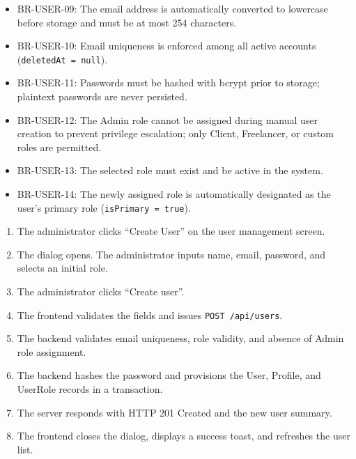\begin{itemize}[leftmargin=1.6em,topsep=3pt,itemsep=2pt,parsep=0pt,label=$\bullet$]\brrulelist
    \item BR-USER-09: The email address is automatically converted to lowercase before storage and must be at most 254 characters.
    \item BR-USER-10: Email uniqueness is enforced among all active accounts (\texttt{deletedAt = null}).
    \item BR-USER-11: Passwords must be hashed with bcrypt prior to storage; plaintext passwords are never persisted.
    \item BR-USER-12: The Admin role cannot be assigned during manual user creation to prevent privilege escalation; only Client, Freelancer, or custom roles are permitted.
    \item BR-USER-13: The selected role must exist and be active in the system.
    \item BR-USER-14: The newly assigned role is automatically designated as the user's primary role (\texttt{isPrimary = true}).
\end{itemize}

\begin{enumerate}[leftmargin=1.6em,topsep=3pt,itemsep=2pt,parsep=0pt]
    \item The administrator clicks ``Create User'' on the user management screen.
    \item The dialog opens. The administrator inputs name, email, password, and selects an initial role.
    \item The administrator clicks ``Create user''.
    \item The frontend validates the fields and issues \texttt{POST /api/users}.
    \item The backend validates email uniqueness, role validity, and absence of Admin role assignment.
    \item The backend hashes the password and provisions the User, Profile, and UserRole records in a transaction.
    \item The server responds with HTTP 201 Created and the new user summary.
    \item The frontend closes the dialog, displays a success toast, and refreshes the user list.
\end{enumerate}

